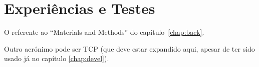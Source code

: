 \chapter{Experiências e Testes}\label{chap:tests}

O referente ao ``Materials and Methods'' do capítulo~\ref{chap:back}.

Outro acrónimo pode ser \ac{TCP} (que deve estar expandido aqui, apesar de ter sido usado já no capítulo \ref{chap:devel}).

\lipsum
